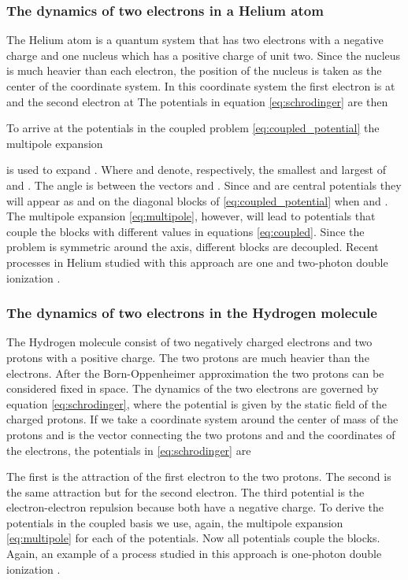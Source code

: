 \documentclass[mathpazo]{cicp}
\theoremstyle{definition}
\numberwithin{equation}{section}
\providecommand{\wv}{}
\providecommand{\hbz}{}
\begin{document}
\subsubsection{The dynamics of two electrons in  a Helium atom}
The Helium atom is a quantum system that has two electrons with a negative charge
and one nucleus \hbz{which} has a positive charge of unit two.
Since the nucleus is much heavier than each electron, the position of the
nucleus is taken as the center of the coordinate system.
In this coordinate system the first electron is at  and the second electron at
 The potentials in equation \eqref{eq:schrodinger} are then

To arrive at the potentials in the coupled problem \eqref{eq:coupled_potential} the multipole expansion

is used to expand . Where  and  denote,
respectively, the smallest and largest of  and . The
angle  is between the vectors  and
.  Since  and  are central potentials they
will appear as  and  on the diagonal blocks of
\eqref{eq:coupled_potential} when  and
.  The multipole expansion \eqref{eq:multipole},
however, will lead to potentials that couple the blocks with different
 values in equations \eqref{eq:coupled}.  Since the problem is
symmetric around the  axis, different  blocks are
decoupled. Recent processes in Helium studied with this approach are
one and two-photon double ionization
\cite{mccurdy2004theoretical,horner2007two}.

\subsubsection{The dynamics of two electrons in the Hydrogen molecule}
The Hydrogen molecule consist of two negatively charged electrons and
two protons with a positive charge. The two protons are much heavier
than the electrons.  After the Born-Oppenheimer approximation \wv{the two protons can be considered fixed in space}. The
dynamics of the two electrons are governed by equation
\eqref{eq:schrodinger}, where the potential is given by the static
field of the charged protons.  If we take a coordinate system around
the center of mass of the protons and  is the vector
connecting the two protons \wv{and  and  the coordinates of the electrons}, the potentials in \eqref{eq:schrodinger}
are


The first is the attraction of the first electron to the two
protons. The second is the same attraction but for the second
electron.  The third potential is the electron-electron repulsion
because both have a negative charge.  To derive the potentials in the
coupled basis we use, again, the multipole expansion
\eqref{eq:multipole} for each of the potentials.  \wv{Now all potentials 
couple the blocks.}  Again, an example of a process studied in this
approach is one-photon double ionization \cite{Wim05}.
\end{document}
